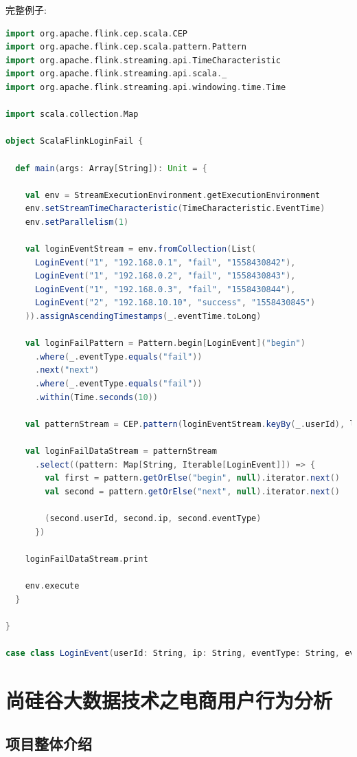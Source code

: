 \documentclass[oneside]{ctexbook}
\begin{document}
完整例子:

\begin{lstlisting}[language=scala]
import org.apache.flink.cep.scala.CEP
import org.apache.flink.cep.scala.pattern.Pattern
import org.apache.flink.streaming.api.TimeCharacteristic
import org.apache.flink.streaming.api.scala._
import org.apache.flink.streaming.api.windowing.time.Time

import scala.collection.Map

object ScalaFlinkLoginFail {

  def main(args: Array[String]): Unit = {

    val env = StreamExecutionEnvironment.getExecutionEnvironment
    env.setStreamTimeCharacteristic(TimeCharacteristic.EventTime)
    env.setParallelism(1)

    val loginEventStream = env.fromCollection(List(
      LoginEvent("1", "192.168.0.1", "fail", "1558430842"),
      LoginEvent("1", "192.168.0.2", "fail", "1558430843"),
      LoginEvent("1", "192.168.0.3", "fail", "1558430844"),
      LoginEvent("2", "192.168.10.10", "success", "1558430845")
    )).assignAscendingTimestamps(_.eventTime.toLong)

    val loginFailPattern = Pattern.begin[LoginEvent]("begin")
      .where(_.eventType.equals("fail"))
      .next("next")
      .where(_.eventType.equals("fail"))
      .within(Time.seconds(10))

    val patternStream = CEP.pattern(loginEventStream.keyBy(_.userId), loginFailPattern)

    val loginFailDataStream = patternStream
      .select((pattern: Map[String, Iterable[LoginEvent]]) => {
        val first = pattern.getOrElse("begin", null).iterator.next()
        val second = pattern.getOrElse("next", null).iterator.next()

        (second.userId, second.ip, second.eventType)
      })

    loginFailDataStream.print

    env.execute
  }

}

case class LoginEvent(userId: String, ip: String, eventType: String, eventTime: String)
\end{lstlisting}

\chapter{尚硅谷大数据技术之电商用户行为分析}

\section{项目整体介绍}
\end{document}
